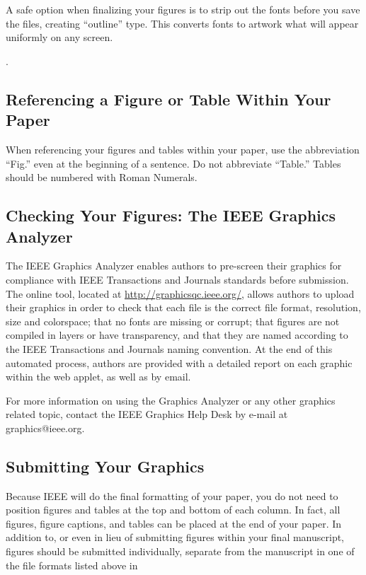 \documentclass[journal,twoside,web]{ieeecolor}
\begin{document}
A safe option when finalizing your figures is to strip out the fonts before 
you save the files, creating ``outline'' type. This converts fonts to 
artwork what will appear uniformly on any screen.

. 



\subsection{Referencing a Figure or Table Within Your Paper}
When referencing your figures and tables within your paper, use the 
abbreviation ``Fig.'' even at the beginning of a sentence. Do not abbreviate 
``Table.'' Tables should be numbered with Roman Numerals.

\subsection{Checking Your Figures: The IEEE Graphics Analyzer}
The IEEE Graphics Analyzer enables authors to pre-screen their graphics for 
compliance with IEEE Transactions and Journals standards before submission. 
The online tool, located at
\underline{http://graphicsqc.ieee.org/}, allows authors to 
upload their graphics in order to check that each file is the correct file 
format, resolution, size and colorspace; that no fonts are missing or 
corrupt; that figures are not compiled in layers or have transparency, and 
that they are named according to the IEEE Transactions and Journals naming 
convention. At the end of this automated process, authors are provided with 
a detailed report on each graphic within the web applet, as well as by 
email.

For more information on using the Graphics Analyzer or any other graphics 
related topic, contact the IEEE Graphics Help Desk by e-mail at 
graphics@ieee.org.

\subsection{Submitting Your Graphics}
Because IEEE will do the final formatting of your paper,
you do not need to position figures and tables at the top and bottom of each 
column. In fact, all figures, figure captions, and tables can be placed at 
the end of your paper. In addition to, or even in lieu of submitting figures 
within your final manuscript, figures should be submitted individually, 
separate from the manuscript in one of the file formats listed above in 
\end{document}
